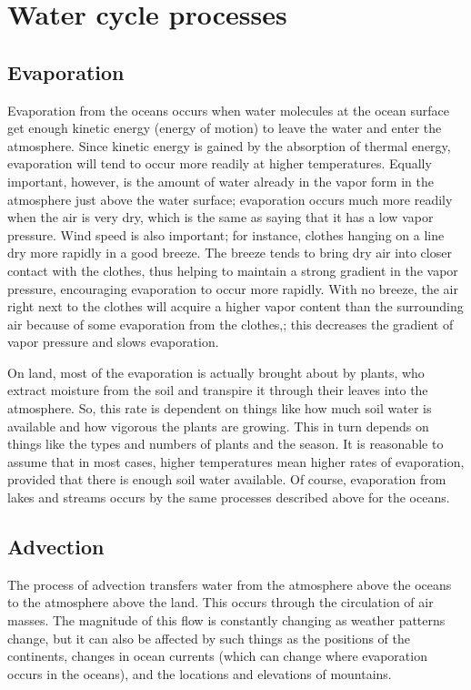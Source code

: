 \documentclass[11pt,letterpaper]{article}
\begin{document}
\section{Water cycle processes}
\subsection{Evaporation}
Evaporation from the oceans occurs when water molecules at the ocean surface get enough kinetic energy (energy of motion) to leave the water and enter the atmosphere. Since kinetic energy is gained by the absorption of thermal energy, evaporation will tend to occur more readily at higher temperatures. Equally important, however, is the amount of water already in the vapor form in the atmosphere just above the water surface; evaporation occurs much more readily when the air is very dry, which is the same as saying that it has a low vapor pressure. Wind speed is also important; for instance, clothes hanging on a line dry more rapidly in a good breeze. The breeze tends to bring dry air into closer contact with the clothes, thus helping to maintain a strong gradient in the vapor pressure, encouraging evaporation to occur more rapidly. With no breeze, the air right next to the clothes will acquire a higher vapor content than the surrounding air because of some evaporation from the clothes,; this decreases the gradient of vapor pressure and slows evaporation.

On land, most of the evaporation is actually brought about by plants, who extract moisture from the soil and transpire it through their leaves into the atmosphere. So, this rate is dependent on things like how much soil water is available and how vigorous the plants are growing. This in turn depends on things like the types and numbers of plants and the season. It is reasonable to assume that in most cases, higher temperatures mean higher rates of evaporation, provided that there is enough soil water available. Of course, evaporation from lakes and streams occurs by the same processes described above for the oceans.

\subsection{Advection}
The process of advection transfers water from the atmosphere above the oceans to the atmosphere above the land. This occurs through the circulation of air masses. The magnitude of this flow is constantly changing as weather patterns change, but it can also be affected by such things as the positions of the continents, changes in ocean currents (which can change where evaporation occurs in the oceans), and the locations and elevations of mountains.
\end{document}
